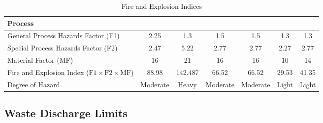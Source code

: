 \begin{landscape}
\begin{table}[H]
\centering
\caption{Fire and Explosion Indices \cite{american_institute_of_chemical_engineers_dows_1994}}
\label{tab:fandeindex}
\begin{tabular}{p{4cm}S[table-format=2.2]S[table-format=2.3]S[table-format=2.2]S[table-format=2.2]S[table-format=2.2]S[table-format=2.3]}
\toprule
Process & {} & {} & {} & {} & {} & {} \\ \midrule
General Process Hazards Factor (F1)                                            & 2.25       & 1.3        & 1.5        & 1.5        & 1.3     & 1.3     \\
Special Process Hazards Factor (F2)                                            & 2.47       & 5.22       & 2.77       & 2.77       & 2.27    & 2.77    \\
Material Factor (MF)                                                           & 16         & 21         & 16         & 16         & 10      & 14      \\ \midrule
Fire and Explosion Index ($\mathrm{F1} \times \mathrm{F2} \times \mathrm{MF}$) & 88.98      & 142.487     & 66.52      & 66.52      & 29.53   & 41.35  \\
Degree of Hazard                                                               & {Moderate} & {Heavy} & {Moderate} & {Moderate} & {Light} & {Light} \\ \bottomrule
\end{tabular}
\end{table}
\end{landscape}


\subsection{Waste Discharge Limits}


